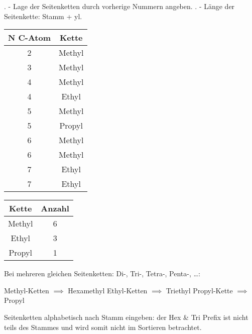 \documentclass{article}
\begin{document}

\clearpage
{}. - Lage der Seitenketten durch vorherige Nummern angeben.\hfill\break
{}. - Länge der Seitenkette: Stamm + yl.\hfill\break

\begin{center}
    \begin{tabular}{c|c}
         N C-Atom & Kette  \\
         \hline
         2 & Methyl \\
         \hline
         3 & Methyl \\
         \hline
         4 & Methyl \\
         4 & Ethyl \\
         \hline
         5 & Methyl \\
         5 & Propyl \\
         \hline
         6 & Methyl \\
         6 & Methyl \\
         \hline
         7 & Ethyl \\
         7 & Ethyl \\
         \hline
    \end{tabular}
    
    \vspace{2cm}
    
    \begin{tabular}{c|c}
        Kette & Anzahl \\
        \hline
        Methyl & 6 \\
        Ethyl & 3 \\
        Propyl & 1 \\
    \end{tabular}
\end{center}


\noindent Bei mehreren gleichen Seitenketten: Di-, Tri-, Tetra-, Penta-, …:\hfill\vspace{1cm}\break

 Methyl-Ketten $\implies$ Hexamethyl\hfill\break
{} Ethyl-Ketten $\implies$ Triethyl\hfill\break
{} Propyl-Kette $\implies$ Propyl\hfill\vspace{5mm}\break


\noindent Seitenketten alphabetisch nach Stamm eingeben:\hfill\vspace{5mm}\break
\noindent der Hex \& Tri Prefix ist nicht teils des Stammes und wird somit nicht im Sortieren betrachtet.\hfill\vspace{5mm}\break
\end{document}
